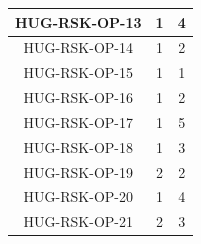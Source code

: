 \begin{table}[H]
\begin{minipage}{0.48\textwidth}
\begin{tabular}{|c|c|c|}
        HUG-RSK-OP-13  & 1 & 4 \\ \hline
        HUG-RSK-OP-14  & 1 & 2 \\ \hline
        HUG-RSK-OP-15  & 1 & 1 \\ \hline
        HUG-RSK-OP-16  & 1 & 2 \\ \hline
        HUG-RSK-OP-17  & 1 & 5 \\ \hline
        HUG-RSK-OP-18  & 1 & 3 \\ \hline
        HUG-RSK-OP-19  & 2 & 2 \\ \hline
        HUG-RSK-OP-20  & 1 & 4 \\ \hline
        HUG-RSK-OP-21  & 2 & 3 \\ \hline
        \end{tabular}
    \end{minipage}

\end{table}







